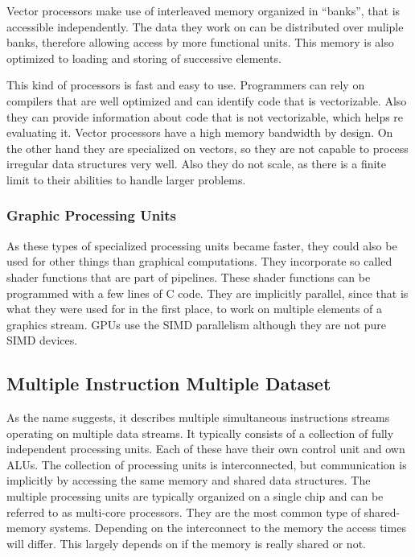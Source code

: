 \documentclass{article}
\begin{document}
	Vector processors make use of interleaved memory organized in “banks”,
	that is accessible independently.
	The data they work on can be distributed over muliple banks,
	therefore allowing access by more functional units.
	This memory is also optimized to loading and storing of successive elements.

	This kind of processors is fast and easy to use. 
	Programmers can rely on compilers that are well optimized
	and can identify code that is vectorizable.
	Also they can provide information about code that is not vectorizable,
	which helps re evaluating it.
	Vector processors have a high memory bandwidth by design.
	On the other hand they are specialized on vectors,
	so they are not capable to process irregular data structures very well.
	Also they do not scale,
	as there is a finite limit to their abilities to handle larger problems.
	
	\subsubsection{Graphic Processing Units} %
	\label{ssub:graphic_processing_units}
	As these types of specialized processing units became faster,
	they could also be used for other things than graphical computations.
	They incorporate so called shader functions that are part of pipelines.
	These shader functions can be programmed with a few lines of C code.
	They are implicitly parallel, since that is what they were used for in the first place,
	to work on multiple elements of a graphics stream.
	GPUs use the SIMD parallelism although they are not pure SIMD devices.

\subsection{Multiple Instruction Multiple Dataset} %
\label{sub:multiple_instruction_multiple_dataset}
As the name suggests,
it describes multiple simultaneous instructions streams operating on multiple data streams.
It typically consists of a collection of fully independent processing units.
Each of these have their own control unit and own ALUs.
The collection of processing units is interconnected,
but communication is implicitly by accessing the same memory and shared data structures.
The multiple processing units are typically organized on a single chip
and can be referred to as multi-core processors.
They are the most common type of shared-memory systems.
Depending on the interconnect to the memory the access times will differ. 
This largely depends on if the memory is really shared or not.

\end{document}
